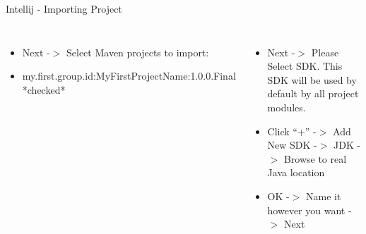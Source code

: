 \documentclass[aspectratio=1610,english]{beamer} %
\begin{document}
	\begin{frame}{Intellij - Importing Project}
		\begin{columns}
				\begin{itemize}
					\tiny
					\color{black}
					\item Next -$>$ Select Maven projects to import: 
					\item my.first.group.id:MyFirstProjectName:1.0.0.Final *checked* 
				\end{itemize}
				\fontsize{4}{5} \selectfont
				
				\begin{itemize}
					\tiny
					\color{black}
					\item Next -$>$ Please Select SDK. This SDK will be used by default by all project modules.
					\item Click “+” -$>$ Add New SDK -$>$ JDK -$>$ Browse to real Java location 
					\item OK -$>$ Name it however you want -$>$ Next
				\end{itemize}
				\fontsize{4}{5} \selectfont
				

\end{columns}
\end{frame}
\end{document}
